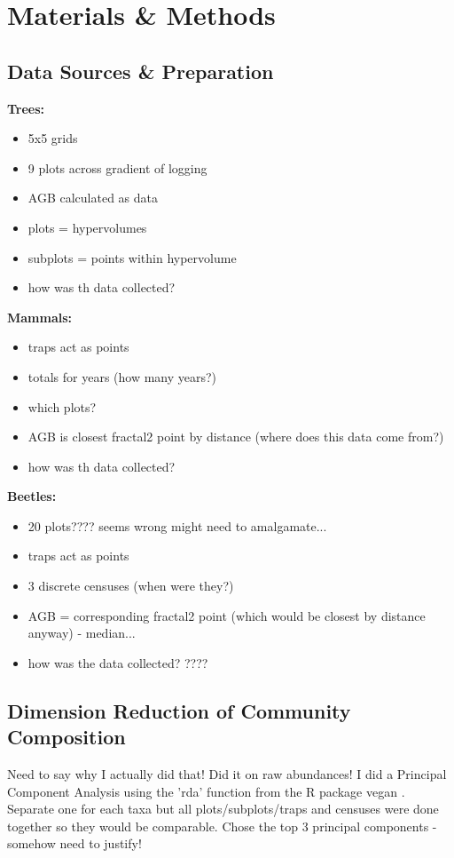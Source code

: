 
\section{Materials \& Methods}


\subsection{Data Sources \& Preparation}

	\textbf{Trees:}
	\begin{itemize}
		\item 5x5 grids
		\item 9 plots across gradient of logging
		\item AGB calculated as data
		\item plots = hypervolumes
		\item subplots = points within hypervolume
		\item how was th data collected? \citep{Riutta2018}
	\end{itemize}
	
	\textbf{Mammals:}
	\begin{itemize}
		\item traps act as points
		\item totals for years (how many years?)
		\item which plots?
		\item AGB is closest fractal2 point by distance (where does this data come from?)
		\item how was th data collected? \citep{Wearn2017}
	\end{itemize}
	
	\textbf{Beetles:}
	\begin{itemize}
		\item 20 plots???? seems wrong might need to amalgamate...
		\item traps act as points
		\item 3 discrete censuses (when were they?)
		\item AGB = corresponding fractal2 point (which would be closest by distance anyway) - median...
		\item how was the data collected? ????
	\end{itemize}
		
\subsection{Dimension Reduction of Community Composition}
	Need to say why I actually did that!
	Did it on raw abundances!
	I did a Principal Component Analysis using the 'rda' function from the R package vegan \citep{Oksanen2018}.
	Separate one for each taxa but all plots/subplots/traps and censuses were done together so they would be comparable.
	Chose the top 3 principal components - somehow need to justify!

